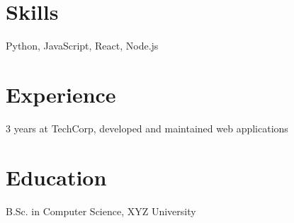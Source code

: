 \documentclass[12pt]{article}
\begin{document}
\section*{Skills}
Python, JavaScript, React, Node.js

\section*{Experience}
3 years at TechCorp, developed and maintained web applications

\section*{Education}
B.Sc. in Computer Science, XYZ University
\end{document}
